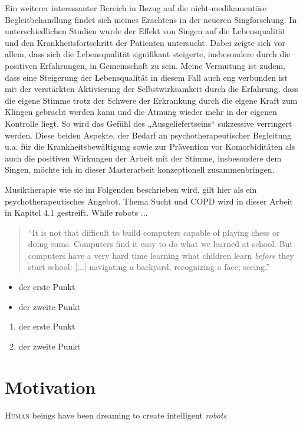 Ein weiterer interessanter Bereich in Bezug auf die nicht-medikamentöse Begleitbehandlung findet sich meines Erachtens in der neueren Singforschung. In unterschiedlichen Studien wurde der Effekt von Singen auf die Lebensqualität und den Krankheitsfortschritt der Patienten untersucht. Dabei zeigte sich vor allem, dass sich die Lebensqualität signifikant steigerte, insbesondere durch die positiven Erfahrungen, in Gemeinschaft zu sein. Meine Vermutung ist zudem, dass eine Steigerung der Lebensqualität in diesem Fall auch eng verbunden ist mit der verstärkten Aktivierung der Selbstwirksamkeit durch die Erfahrung, dass die eigene Stimme trotz der Schwere der Erkrankung durch die eigene Kraft zum Klingen gebracht werden kann und die Atmung wieder mehr in der eigenen Kontrolle liegt. So wird das Gefühl des „Ausgeliefertseins“ sukzessive verringert werden.
Diese beiden Aspekte, der Bedarf an psychotherapeutischer Begleitung u.a. für die Krankheitsbewältigung sowie zur Prävention vor Komorbiditäten als auch die positiven Wirkungen der Arbeit mit der Stimme, insbesondere dem Singen, möchte ich in dieser Masterarbeit konzeptionell zusammenbringen.

Musiktherapie wie sie im Folgenden beschrieben wird, gilt hier als ein psychotherapeutisches Angebot.
Thema Sucht und COPD wird in dieser Arbeit in Kapitel 4.1 gestreift. 
While robots ...

\begin{quote}
``It is not that difficult to build computers capable of playing chess or doing sums. Computers find it easy to do what we learned at school. But computers have a very hard time learning what children learn \textit{before} they start school: [...] navigating a backyard, recognizing a face; seeing.'' 
\end{quote}

\begin{itemize}
\item der erste Punkt
\item der zweite Punkt
\end{itemize}

\begin{enumerate}
\item der erste Punkt
\item der zweite Punkt
\end{enumerate}

\section{Motivation} %
\lettrine{H}{uman} beings have been dreaming to create intelligent \emph{robots} 

